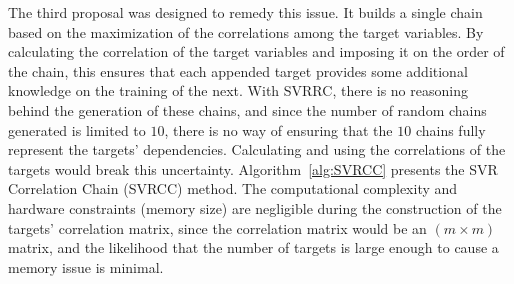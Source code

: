 \documentclass[reqno]{vcuthesis}
\numberwithin{equation}{chapter}
\begin{document}
The third proposal was designed to remedy this issue. It builds a single chain based on the maximization of the correlations among the target variables. By calculating the correlation of the target variables and imposing it on the order of the chain, this ensures that each appended target provides some additional knowledge on the training of the next. With SVRRC, there is no reasoning behind the generation of these chains, and since the number of random chains generated is limited to $10$, there is no way of ensuring that the $10$ chains fully represent the targets' dependencies. Calculating and using the correlations of the targets would break this uncertainty. Algorithm~\ref{alg:SVRCC} presents the SVR Correlation Chain (SVRCC) method. The computational complexity and hardware constraints (memory size) are negligible during the construction of the targets' correlation matrix, since the correlation matrix would be an $(m \times m)$ matrix, and the likelihood that the number of targets is large enough to cause a memory issue is minimal. 
\end{document}
